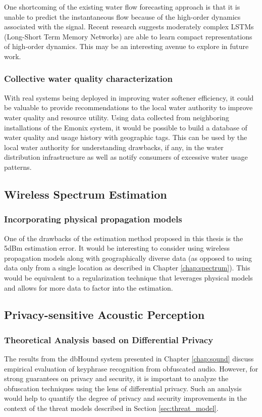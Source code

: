 One shortcoming of the existing water flow forecasting approach is that it is unable to predict the instantaneous flow because of the high-order dynamics associated with the signal.
 Recent research suggests moderately complex LSTMs (Long-Short Term Memory Networks) are able to learn compact representations of high-order dynamics.
 This may be an interesting avenue to explore in future work.

\subsubsection{Collective water quality characterization}

With real systems being deployed in improving water softener efficiency, it could be valuable to provide recommendations to the local water authority to improve water quality and resource utility.
 Using data collected from neighboring installations of the Emonix system, it would be possible to build a database of water quality and usage history with geographic tags.
 This can be used by the local water authority for understanding drawbacks, if any, in the water distribution infrastructure as well as notify consumers of excessive water usage patterns.


\subsection{Wireless Spectrum Estimation}

\subsubsection{Incorporating physical propagation models}

One of the drawbacks of the estimation method proposed in this thesis is the 5dBm estimation error.
 It would be interesting to consider using wireless propagation models along with geographically diverse data (as opposed to using data only from a single location as described in Chapter \ref{chap:spectrum}).
 This would be equivalent to a regularization technique that leverages physical models and allows for more data to factor into the estimation.


\subsection{Privacy-sensitive Acoustic Perception}

\subsubsection{Theoretical Analysis based on Differential Privacy}

The results from the dbHound system presented in Chapter \ref{chap:sound} discuss empirical evaluation of keyphrase recognition from obfuscated audio.
 However, for strong guarantees on privacy and security, it is important to analyze the obfuscation techniques using the lens of differential privacy.
 Such an analysis would help to quantify the degree of privacy and security improvements in the context of the threat models described in Section \ref{sec:threat_model}.

